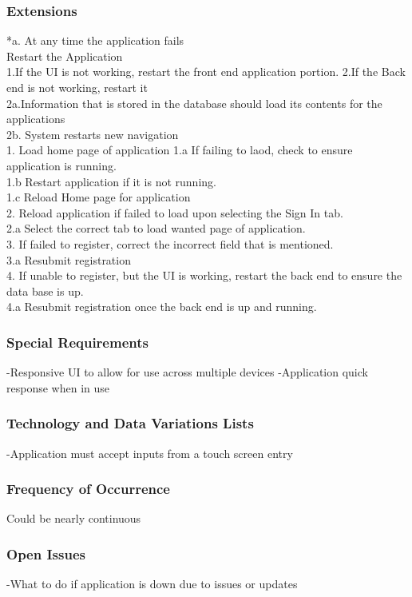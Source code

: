 \documentclass{article}
\begin{document}
	
	\subsubsection{\textbf{Extensions}}
	*a. At any time the application fails \\
	Restart the Application \\
	1.If the UI is not working, restart the front end application portion.
	2.If the Back end is not working, restart it \\
	2a.Information that is stored in the database should load its contents for the applications \\
	2b. System restarts new navigation \\
	1. Load home page of application
	1.a  If failing to laod, check to ensure application is running. \\
	1.b Restart application if it is not running. \\
	1.c Reload Home page for application \\
	2. Reload application if failed to load upon selecting the Sign In tab. \\
	2.a Select the correct tab to load wanted page of application.\\
	3. If failed to register, correct the incorrect field that is mentioned. \\
	3.a Resubmit registration\\
	4. If unable to register, but the UI is working, restart the back end to ensure the data base is up. \\
	4.a Resubmit registration once the back end is up and running.
	
	\subsubsection{\textbf{Special Requirements}}
	-Responsive UI to allow for use across multiple devices
	-Application quick response when in use
	\subsubsection{\textbf{Technology and Data Variations Lists}}
	-Application must accept inputs from a touch screen entry
	\subsubsection{\textbf{Frequency of Occurrence}}
	Could be nearly continuous
	\subsubsection{\textbf{Open Issues}}
	-What to do if application is down due to issues or updates
	
\end{document}
